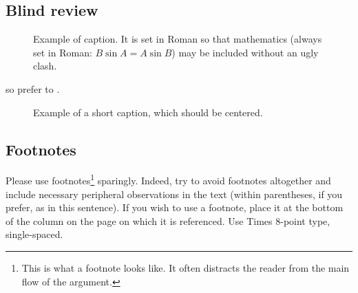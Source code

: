\documentclass[10pt,twocolumn,letterpaper]{article}
\begin{document}
\subsection{Blind review}
\begin{figure}[t]
\begin{center}
\fbox{\rule{0pt}{2in} \rule{0.9\linewidth}{0pt}}
\end{center}
   \caption{Example of caption.  It is set in Roman so that mathematics
   (always set in Roman: $B \sin A = A \sin B$) may be included without an
   ugly clash.}
\label{fig:long}
\label{fig:onecol}
\end{figure}


so prefer \cite{Alpher03,Alpher02,Authors14} to
\cite{Alpher02,Alpher03,Authors14}.


\begin{figure*}
\begin{center}
\fbox{\rule{0pt}{2in} \rule{.9\linewidth}{0pt}}
\end{center}
   \caption{Example of a short caption, which should be centered.}
\label{fig:short}
\end{figure*}


\subsection{Footnotes}

Please use footnotes\footnote {This is what a footnote looks like.  It
often distracts the reader from the main flow of the argument.} sparingly.
Indeed, try to avoid footnotes altogether and include necessary peripheral
observations in
the text (within parentheses, if you prefer, as in this sentence).  If you
wish to use a footnote, place it at the bottom of the column on the page on
which it is referenced. Use Times 8-point type, single-spaced.






{\small


}
\end{document}
